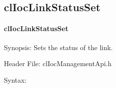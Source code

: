 \begin{flushleft}
\subsection{clIocLinkStatusSet}
\hypertarget{pageioc213}{}\paragraph{cl\-Ioc\-Link\-Status\-Set}\label{pageioc213}
\begin{Desc}
\item[Synopsis:]Sets the status of the link.\end{Desc}
\begin{Desc}
\item[Header File:]clIocManagementApi.h\end{Desc}
\begin{Desc}
\item[Syntax:]


\end{Desc}
\end{flushleft}
